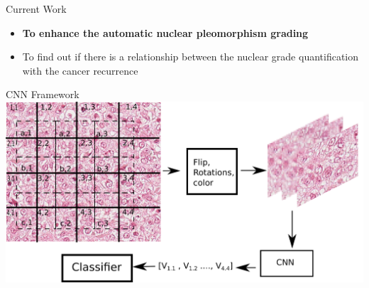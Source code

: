 \documentclass[usenames,dvipsnames]{beamer}
\begin{document}
\begin{frame}{Current Work}

\begin{itemize}
    \item \textbf{To enhance the automatic nuclear pleomorphism grading}
    \item To find out if there is a relationship between the nuclear grade quantification with the cancer recurrence
\end{itemize}
    
\end{frame}


\begin{frame}{CNN Framework}
    \centering
    \includegraphics[width=1\textwidth]{imagenes_cnn/CCn_methodF.png}
 
\end{frame}
\end{document}
